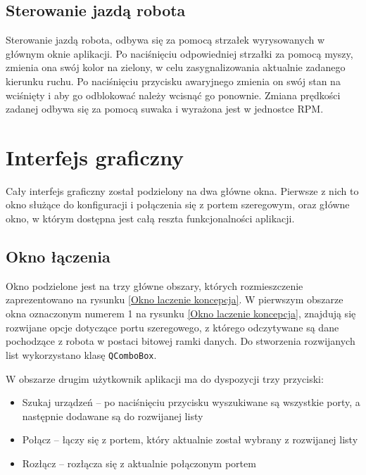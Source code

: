 \subsection{Sterowanie jazdą robota}

Sterowanie jazdą robota, odbywa się za pomocą strzałek wyrysowanych w głównym oknie aplikacji. Po naciśnięciu odpowiedniej strzałki za pomocą myszy, zmienia ona swój kolor na zielony, w celu zasygnalizowania aktualnie zadanego kierunku ruchu. Po naciśnięciu przycisku awaryjnego zmienia on swój stan na wciśnięty i aby go odblokować należy wcisnąć go ponownie. Zmiana prędkości zadanej odbywa się za pomocą suwaka i wyrażona jest w jednostce RPM.          

\section{Interfejs graficzny}

Cały interfejs graficzny został podzielony na dwa główne okna. Pierwsze z nich to okno służące do konfiguracji i połączenia się z portem szeregowym, oraz główne okno, w którym dostępna jest całą reszta funkcjonalności aplikacji. 

\subsection{Okno łączenia}

Okno podzielone jest na trzy główne obszary, których rozmieszczenie zaprezentowano na rysunku \ref{Okno laczenie koncepcja}.
W pierwszym obszarze okna oznaczonym numerem 1 na rysunku \ref{Okno laczenie koncepcja}, znajdują się rozwijane opcje dotyczące portu szeregowego, z którego odczytywane są dane pochodzące z robota w postaci bitowej ramki danych. Do stworzenia rozwijanych list wykorzystano klasę \texttt{QComboBox}.

W obszarze drugim użytkownik aplikacji ma do dyspozycji trzy przyciski:
\begin{itemize}
    \item Szukaj urządzeń -- po naciśnięciu przycisku wyszukiwane są wszystkie porty, a następnie dodawane są do rozwijanej listy
    \item Połącz -- łączy się z portem, który aktualnie został wybrany z rozwijanej listy
    \item Rozłącz -- rozłącza się z aktualnie połączonym portem
\end{itemize}

